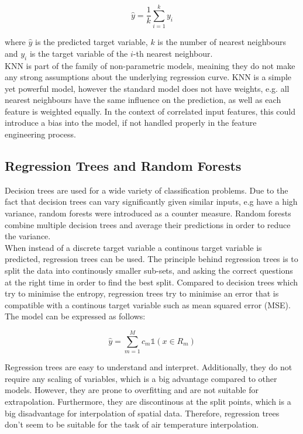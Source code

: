 \begin{equation}
    \hat{y} = \frac{1}{k} \sum_{i=1}^{k} y_i
\end{equation}

where $\hat{y}$ is the predicted target variable, $k$ is the number of nearest neighbours and $y_i$ is the target variable of the $i$-th nearest neighbour.\\
KNN is part of the family of non-parametric models, meaining they do not make any strong assumptions about the underlying regression curve. KNN is a simple yet powerful model, however the standard model does not have weights, e.g. all nearest neighbours have the same influence on the prediction, as well as each feature is weighted equally. In the context of correlated input features, this could introduce a bias into the model, if not handled properly in the feature engineering process.


\subsection{Regression Trees and Random Forests}

Decision trees are used for a wide variety of classification problems. Due to the fact that decision trees can vary significantly given similar inputs, e.g have a high variance, random forests were introduced as a counter measure. Random forests combine multiple decision trees and average their predictions in order to reduce the variance.\\ 
When instead of a discrete target variable a continous target variable is predicted, regression trees can be used. The principle behind regression trees is to split the data into continously smaller sub-sets, and asking the correct questions at the right time in order to find the best split. Compared to decision trees which try to minimise the entropy, regression trees try to minimise an error that is compatible with a continous target variable such as mean squared error (MSE). The model can be expressed as follows:

\begin{equation}
    \hat{y} = \sum_{m=1}^M c_m \mathbb{1}(x \in R_m)
\end{equation}

Regression trees are easy to understand and interpret. Additionally, they do not require any scaling of variables, which is a big advantage compared to other models. However, they are prone to overfitting and are not suitable for extrapolation. Furthermore, they are discontinous at the split points, which is a big disadvantage for interpolation of spatial data. Therefore, regression trees don't seem to be suitable for the task of air temperature interpolation.

